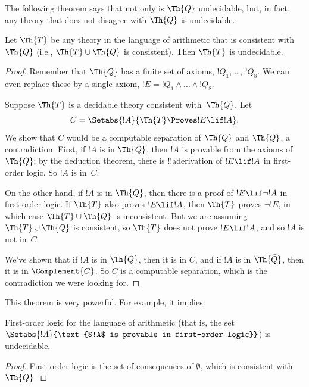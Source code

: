\documentclass[../../../include/open-logic-section]{subfiles}
\begin{document}


The following theorem says that not only is $\Th{Q}$ undecidable, but, in
fact, any theory that does not disagree with $\Th{Q}$ is undecidable.

\begin{thm}
Let $\Th{T}$ be any theory in the language of arithmetic that is
consistent with $\Th{Q}$ (i.e., $\Th{T} \cup \Th{Q}$ is
consistent). Then $\Th{T}$ is undecidable.
\end{thm}

\begin{proof}
Remember that $\Th{Q}$ has a finite set of axioms, $!Q_1$, \dots,
$!Q_8$. We can even replace these by a single axiom, $!E = !Q_1 \land
\dots \land !Q_8$.

Suppose $\Th{T}$ is a decidable theory consistent with~$\Th{Q}$. Let
\[
C = \Setabs{!A}{\Th{T} \Proves !E \lif !A}.
\]
We show that $C$ would be a computable separation of $\Th{Q}$ and
$\Th{\bar Q}$, a contradiction. First, if $!A$ is in $\Th{Q}$, then
$!A$ is provable from the axioms of $\Th{Q}$; by the deduction
theorem, there is !!a{derivation} of $!E \lif !A$ in first-order logic. So
$!A$ is in~$C$.

On the other hand, if $!A$ is in $\Th{\bar Q}$, then there is a proof
of $!E \lif \lnot !A$ in first-order logic. If $\Th{T}$ also proves
$!E \lif !A$, then $\Th{T}$ proves $\lnot !E$, in which case $\Th{T}
\cup \Th{Q}$ is inconsistent. But we are assuming $\Th{T} \cup \Th{Q}$
is consistent, so $\Th{T}$ does not prove $!E \lif !A$, and so $!A$
is not in~$C$.

We've shown that if $!A$ is in $\Th{Q}$, then it is in $C$, and if
$!A$ is in $\Th{\bar Q}$, then it is in $\Complement{C}$. So $C$ is a
computable separation, which is the contradiction we were looking for.
\end{proof}

This theorem is very powerful. For example, it implies:

\begin{cor}
  First-order logic for the language of arithmetic (that is, the set
  $\Setabs{!A}{\text{$!A$ is provable in first-order logic}}$) is
  undecidable.
\end{cor}

\begin{proof}
First-order logic is the set of consequences of $\emptyset$,
which is consistent with~$\Th{Q}$.
\end{proof}
\end{document}
